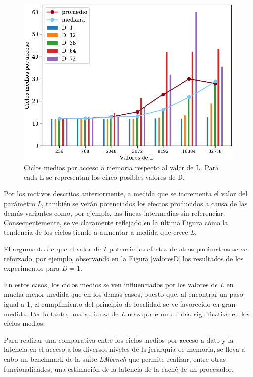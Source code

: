 \documentclass[conference]{IEEEtran}
\begin{document}
\begin{figure}[htbp]
\centerline{\includegraphics[scale=0.64]{valoresL.pdf}}
\caption{Ciclos medios por acceso a memoria respecto al valor de L. Para cada L se representan los cinco posibles valores de D.}
\label{valoresL}
\end{figure}

Por los motivos descritos anteriormente, a medida que se incrementa el valor del parámetro \textit{L}, también se verán potenciados los efectos producidos a causa de las demás variantes como, por ejemplo, las líneas intermedias sin referenciar.
Consecuentemente, se ve claramente reflejado en la última Figura cómo la tendencia de los ciclos tiende a aumentar a medida que crece \textit{L}.

El argumento de que el valor de \textit{L} potencie los efectos de otros parámetros se ve reforzado, por ejemplo, observando en la Figura \ref{valoresD} los resultados de los experimentos para \textit{D} = 1.

En estos casos, los ciclos medios se ven influenciados por los valores de \textit{L} en mucha menor medida que en los demás casos, puesto que, al encontrar un paso igual a 1, el cumplimiento del principio de localidad se ve favorecido en gran medida. Por lo tanto, una varianza de \textit{L} no supone un cambio significativo en los ciclos medios.

Para realizar una comparativa entre los ciclos medios por acceso a dato y la latencia en el acceso a los diversos niveles de la jerarquía de memoria, se lleva a cabo un benchmark de la suite \textit{LMbench} \cite{lmbenchDescarga}\cite{lmbenchPaper} que permite realizar, entre otras funcionalidades, una estimación de la latencia de la caché de un procesador.
\end{document}
